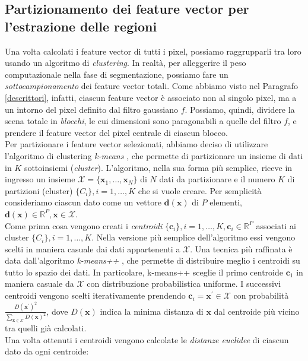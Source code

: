 \subsection{Partizionamento dei feature vector per l'estrazione delle regioni}
Una volta calcolati i feature vector di tutti i pixel, possiamo raggrupparli tra loro usando un algoritmo di \textit{clustering}.
In realt\`a, per alleggerire il peso computazionale nella fase di segmentazione, possiamo fare un \textit{sottocampionamento} dei feature vector totali.
Come abbiamo visto nel Paragrafo \ref{descrittori}, infatti, ciascun feature vector \`e associato non al singolo pixel, ma a un intorno del pixel definito dal filtro gaussiano $f$.
Possiamo, quindi, dividere la scena totale in \textit{blocchi}, le cui dimensioni sono paragonabili a quelle del filtro $f$, e prendere il feature vector del pixel centrale di ciascun blocco.\\ 
Per partizionare i feature vector selezionati, abbiamo deciso di utilizzare l'algoritmo di clustering \textit{k-means} \cite{han2006data, lloyd1982least}, che permette di partizionare un insieme di dati in $K$ sottoinsiemi (\textit{cluster}).
L'algoritmo, nella sua forma pi\`u semplice, riceve in ingresso un insieme $\mathcal{X} = \{\textbf{x}_1,\dots,\textbf{x}_N\}$ di $N$ dati da partizionare e il numero $K$ di partizioni (cluster) $\{C_i\}, i=1,\dots,K$ che si vuole creare.
Per semplicit\`a consideriamo ciascun dato come un vettore $\textbf{d}(\textbf{x})$ di $P$ elementi, $\textbf{d}(\textbf{x})\in\mathbb{R}^P, \textbf{x}\in \mathcal{X}$.\\
Come prima cosa vengono creati i \textit{centroidi} $\{\textbf{c}_i\}, i=1,\dots,K, \textbf{c}_i \in \mathbb{R}^P$ associati ai cluster $\{C_i\}, i=1,\dots,K$.
Nella versione pi\`u semplice dell'algoritmo essi vengono scelti in maniera casuale dai dati appartenenti a $\mathcal{X}$.
Una tecnica pi\`u raffinata \`e data dall'algoritmo \textit{k-means++} \cite{arthur2007k}, che permette di distribuire meglio i centroidi su tutto lo spazio dei dati.
In particolare, k-means++ sceglie il primo centroide $\textbf{c}_1$ in maniera casuale da $\mathcal{X}$ con distribuzione probabilistica uniforme.
I successivi centroidi vengono scelti iterativamente prendendo $\textbf{c}_i=\textbf{x}^\prime\in\mathcal{X}$ con probabilit\`a $\frac{D(\textbf{x}^\prime)^2}{\sum_{\textbf{x}\in \mathcal{X}}D(\textbf{x})^2}$, dove $D(\textbf{x})$ indica la minima distanza di $\textbf{x}$ dal centroide pi\`u vicino tra quelli gi\`a calcolati.\\
Una volta ottenuti i centroidi vengono calcolate le \textit{distanze euclidee} di ciascun dato da ogni centroide:
